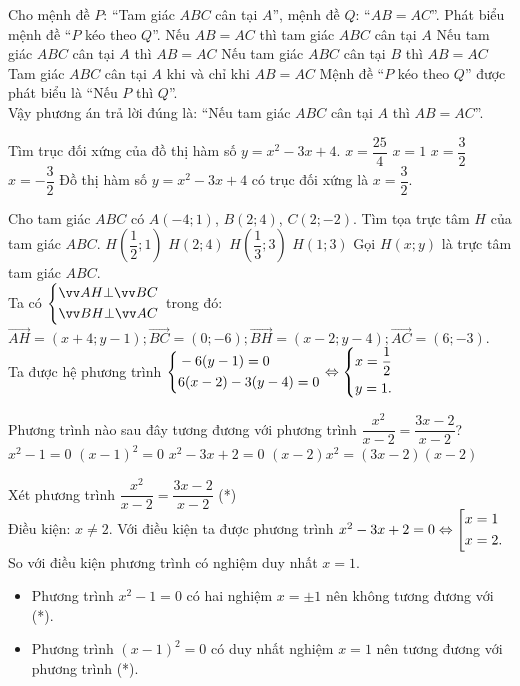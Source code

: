 \begin{ex}%
Cho mệnh đề  $P$: ``Tam giác  $ABC$  cân tại  $A$'', mệnh đề  $Q$: ``$AB=AC$''. Phát biểu mệnh đề ``$P$  kéo theo  $Q$''.
\choice
{Nếu  $AB=AC$  thì tam giác  $ABC$  cân tại $A$}
{\True Nếu tam giác  $ABC$  cân tại  $A$  thì  $AB=AC$}
{Nếu tam giác  $ABC$  cân tại  $B$  thì  $AB=AC$}
{Tam giác  $ABC$  cân tại  $A$  khi và chỉ khi  $AB=AC$}
	\loigiai
{Mệnh đề ``$P$  kéo theo  $Q$'' được phát biểu là ``Nếu $P$  thì $Q$''.\\
	Vậy phương án trả lời đúng là:  ``Nếu tam giác  $ABC$  cân tại  $A$  thì  $AB=AC$''.
}
\end{ex}
\begin{ex}%
 Tìm trục đối xứng của đồ thị hàm số $y=x^2-3x+4$.
 \choice
{$x=\dfrac{25}{4}$}
{$x=1$ }
{\True $x=\dfrac{3}{2}$}
{$x=-\dfrac{3}{2}$}
	\loigiai
	{Đồ thị hàm số $y=x^2-3x+4$ có trục đối xứng là $x=\dfrac{3}{2}$.
	}
\end{ex}
\begin{ex}%
Cho tam giác  $ABC$  có  $A(-4;1)$, $B(2;4)$, $C(2;-2)$. Tìm tọa trực tâm  $H$  của tam giác  $ABC.$ 
\choice
{\True  $H\left( \dfrac{1}{2};1 \right)$}
{ $H\left( 2{ };{ }4 \right)$}
{ $H\left( \dfrac{1}{3};3 \right)$}
{ $H\left( 1;3 \right)$}
	\loigiai
	{Gọi $ H(x;y) $ là trực tâm tam giác $ ABC. $ \\
		Ta có $ \heva{\vec{AH} \bot \vec{BC}\\ \vec{BH} \bot \vec{AC} } $ trong đó: $ \vec{AH} = (x +4; y - 1); \vec{BC} = (0;-6); \vec{BH} = (x - 2; y - 4); \vec{AC} = (6;-3).$\\
		Ta được hệ phương trình $ \left\{\begin{aligned}&-6(y-1)=0\\&6(x-2) - 3(y-4)=0\end{aligned}\right. \Leftrightarrow \left\{\begin{aligned}&x=\dfrac{1}{2}\\&y=1.\end{aligned}\right. $
	}
\end{ex}
\begin{ex}%
Phương trình nào sau đây tương đương với phương trình  $\dfrac{x^2}{x-2}=\dfrac{3x-2}{x-2}$?
\choice
{ $x^2-1=0$}
{\True  $\left( x-1 \right)^2=0$}
{ $x^2-3x+2=0$}
{ $\left( x-2 \right)x^2=\left( 3x-2 \right)\left( x-2 \right)$}
	\loigiai
	{Xét phương trình $\dfrac{x^2}{x-2}=\dfrac{3x-2}{x-2}$ (*)\\
Điều kiện: $ x \ne 2. $	
Với điều kiện ta được phương trình $ x^2 - 3x + 2 = 0 \Leftrightarrow \left[\begin{aligned}&x=1\\&x=2.\end{aligned}\right. $ \\
So với điều kiện phương trình có nghiệm duy nhất $ x = 1. $\\
\begin{itemize}
	\item Phương trình  $x^2-1=0$ có hai nghiệm $ x = \pm 1 $ nên không tương đương với (*).
	\item Phương trình $\left( x-1 \right)^2=0$ có duy nhất nghiệm $ x = 1 $ nên tương đương với phương trình (*).
\end{itemize}

}
\end{ex}

